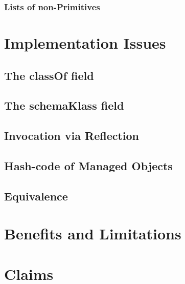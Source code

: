 \subsubsection{Lists of non-Primitives}

\section{Implementation Issues}\label{Implementation Issues}
\subsection{The classOf field}\label{The classOf field}
\subsection{The schemaKlass field}\label{The schemaKlass field}
\subsection{Invocation via Reflection}\label{Invocation via Reflection}
\subsection{Hash-code of Managed Objects}\label{Hashcode of Managed Objects}
\subsection{Equivalence}\label{Managed Object equivalence}

\section{Benefits and Limitations}\label{Benefits and Limitations}

\section{Claims}\label{Implementation Claims}